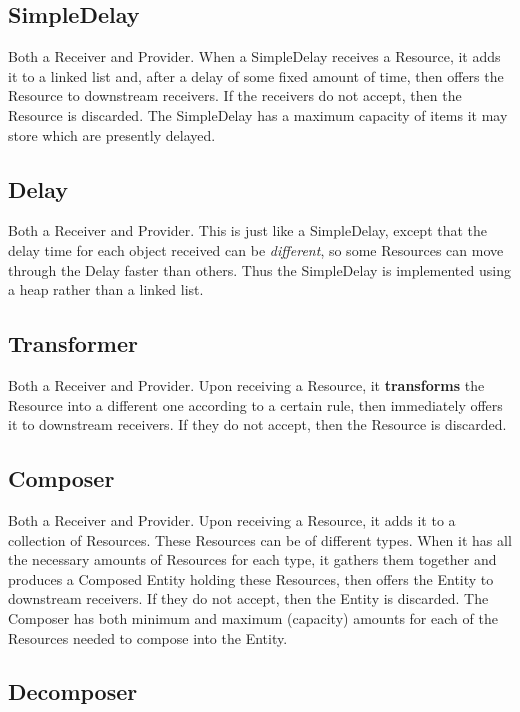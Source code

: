 \documentclass[twoside,10pt]{book}
\begin{document}
\subsection{SimpleDelay}

Both a Receiver and Provider.  When a SimpleDelay receives a Resource, it adds it to a linked list and, after a delay of some fixed amount of time, then offers the Resource to downstream receivers.  If the receivers do not accept, then the Resource is discarded.  The SimpleDelay has a maximum capacity of items it may store which are presently delayed.

\subsection{Delay}

Both a Receiver and Provider.  This is just like a SimpleDelay, except that the delay time for each object received can be {\it different}, so some Resources can move through the Delay faster than others.  Thus the SimpleDelay is implemented using a heap rather than a linked list.

\subsection{Transformer}

Both a Receiver and Provider.  Upon receiving a Resource, it {\bf transforms} the Resource into a different one according to a certain rule, then immediately offers it to downstream receivers.  If they do not accept, then the Resource is discarded.

\subsection{Composer}

Both a Receiver and Provider.  Upon receiving a Resource, it adds it to a collection of Resources. These Resources can be of different types.  When it has all the necessary amounts of Resources for each type, it gathers them together and produces a Composed Entity holding these Resources, then offers the Entity to downstream receivers. If they do not accept, then the Entity is discarded.  The Composer has both minimum and maximum (capacity) amounts for each of the Resources needed to compose into the Entity.

\subsection{Decomposer}
\end{document}
